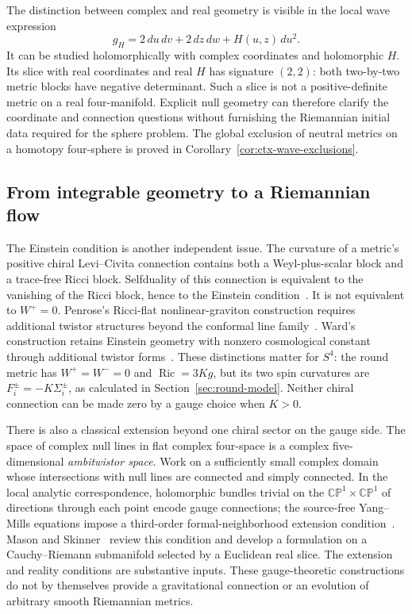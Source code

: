 \documentclass[11pt]{article}
\numberwithin{equation}{section}
\theoremstyle{definition}
\theoremstyle{remark}
\DeclareMathOperator{\Ric}{Ric}
\newcommand{\CP}{\mathbb{CP}}
\begin{document}
The distinction between complex and real geometry is visible in the local
wave expression
\[
 g_H=2\,du\,dv+2\,dz\,dw+H(u,z)\,du^2.
\]
It can be studied holomorphically with complex coordinates and holomorphic
$H$. Its slice with real coordinates and real $H$ has signature $(2,2)$:
both two-by-two metric blocks have negative determinant. Such a slice is
not a positive-definite metric on a real four-manifold. Explicit null
geometry can therefore clarify the coordinate and connection questions
without furnishing the Riemannian initial data required for the sphere
problem. The global exclusion of neutral metrics on a homotopy four-sphere
is proved in Corollary~\ref{cor:ctx-wave-exclusions}.

\subsection{From integrable geometry to a Riemannian flow}

The Einstein condition is another independent issue. The curvature of a
metric's positive chiral Levi--Civita connection contains both a Weyl-plus-scalar
block and a trace-free Ricci block. Selfduality of this connection is
equivalent to the vanishing of the Ricci block, hence to the Einstein
condition~\cite{AHS1978}. It is not equivalent to
$W^+=0$. Penrose's Ricci-flat nonlinear-graviton construction requires
additional twistor structures beyond the conformal line family~\cite{Penrose1976}.
Ward's construction retains Einstein geometry with nonzero cosmological
constant through additional twistor
forms~\cite{Ward1980}. These distinctions matter for $S^4$:
the round metric has $W^+=W^-=0$ and $\Ric=3Kg$, but its two spin
curvatures are $F_i^\pm=-K\Sigma_i^\pm$, as calculated in
Section~\ref{sec:round-model}. Neither chiral connection can be made
zero by a gauge choice when $K>0$.

There is also a classical extension beyond one chiral sector on the gauge
side. The space of complex null lines in flat complex four-space is a
complex five-dimensional \emph{ambitwistor space}. Work on a sufficiently
small complex domain whose intersections with null lines are connected and
simply connected. In the local analytic correspondence, holomorphic bundles
trivial on the $\CP^1\times\CP^1$ of directions
through each point encode gauge connections; the source-free Yang--Mills
equations impose a third-order formal-neighborhood extension
condition~\cite{Witten1978,IsenbergYasskinGreen1978}.
Mason and Skinner~\cite{MasonSkinner2006} review this condition and develop a
formulation on a Cauchy--Riemann submanifold selected by a Euclidean real
slice. The extension and reality conditions are substantive inputs.
These gauge-theoretic constructions do not by
themselves provide a gravitational connection or an evolution of arbitrary
smooth Riemannian metrics.
\end{document}
